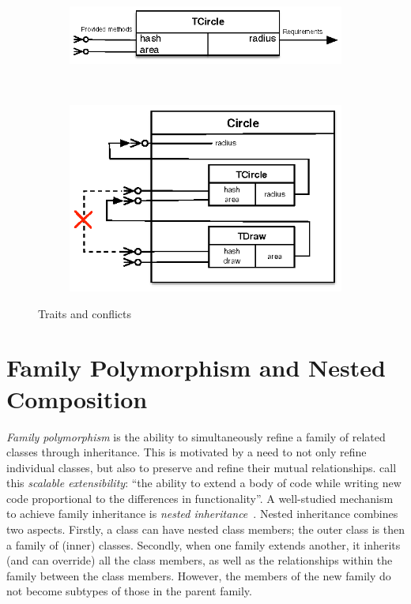 \begin{figure}
  \centering
  \begin{subfigure}[b]{0.45\textwidth}
    \includegraphics[scale=0.85]{figures/trait1.eps}
     \label{fig:trait}
  \end{subfigure} ~
  \begin{subfigure}[b]{0.45\textwidth}
    \includegraphics{figures/trait3.eps}
     \label{fig:trait:conflict}
  \end{subfigure}
  \caption{Traits and conflicts}
\end{figure}


\section{Family Polymorphism and Nested Composition}
\label{sec:ernst}

\emph{Family polymorphism} is the ability to simultaneously refine a family of
related classes through inheritance. This is motivated by a need to not only
refine individual classes, but also to preserve and refine their mutual
relationships. \citet{Nystrom_2004} call this \emph{scalable extensibility}:
``the ability to extend a body of code while writing new code proportional to
the differences in functionality''.
%
A well-studied mechanism to achieve family inheritance is \emph{nested
inheritance}~\citep{Nystrom_2004}. Nested inheritance combines two aspects.
Firstly, a class can have nested class members; the outer class is then a
family of (inner) classes. Secondly, when one family extends another, it
inherits (and can override) all the class members, as well as the relationships
within the family between the class members. However,
the members of the new family do not become subtypes of those in the parent family.

